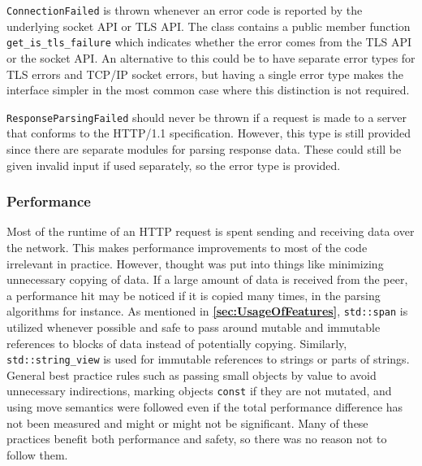 \documentclass[12pt, a4paper]{article}
\begin{document}
\texttt{ConnectionFailed} is thrown whenever an error code is reported by the underlying socket API or TLS API. The class contains a public member function \texttt{get\_is\_tls\_failure} which indicates whether the error comes from the TLS API or the socket API. An alternative to this could be to have separate error types for TLS errors and TCP/IP socket errors, but having a single error type makes the interface simpler in the most common case where this distinction is not required. 

\texttt{ResponseParsingFailed} should never be thrown if a request is made to a server that conforms to the HTTP/1.1 specification. However, this type is still provided since there are separate modules for parsing response data. These could still be given invalid input if used separately, so the error type is provided.

\subsubsection{Performance}
Most of the runtime of an HTTP request is spent sending and receiving data over the network. This makes performance improvements to most of the code irrelevant in practice. However, thought was put into things like minimizing unnecessary copying of data. If a large amount of data is received from the peer, a performance hit may be noticed if it is copied many times, in the parsing algorithms for instance. As mentioned in \textbf{\ref{sec:UsageOfFeatures}}, \texttt{std::span} is utilized whenever possible and safe to pass around mutable and immutable references to blocks of data instead of potentially copying. Similarly, \texttt{std::string\_view} is used for immutable references to strings or parts of strings. General best practice rules such as passing small objects by value to avoid unnecessary indirections, marking objects \texttt{const} if they are not mutated, and using move semantics \parencite{CppCoreGuidelines} were followed even if the total performance difference has not been measured and might or might not be significant. Many of these practices benefit both performance and safety, so there was no reason not to follow them.
\end{document}
